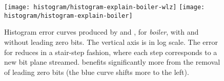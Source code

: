 \begin{figure}[!t]
\centering
{}
{\texttt{[image: histogram/histogram-explain-boiler-wlz]}\vspace{-0.5em}}
{\texttt{[image: histogram/histogram-explain-boiler]}\vspace{-0.5em}}
\vspace{-0.5em}
\caption{Histogram error curves produced by \sbit and \slvl, for \emph{boiler}, with and without
leading zero bits. The vertical axis is in log scale. The error for \sbit reduces in a stair-step
fashion, where each step corresponds to a new bit plane streamed. \sbit benefits significantly more
from the removal of leading zero bits (the blue curve shifts more to the left).}
\label{fig:histogram-explain}
\vspace{-1.5em}
\end{figure}

